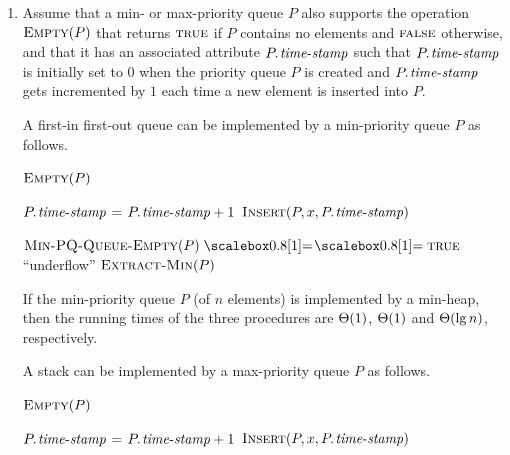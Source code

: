 \begin{enumerate}[\thesection-1]
\begin{codebox}
\li \While $i > 1$ and $\attrib{A[\proc{Parent}(i)]}{key} < \attrib{A[i]}{key}$
\li \Do
         $A[i] \gets A[\proc{Parent}(i)]$, updating the information that maps
\zi      priority queue objects to array indices
\li      $i \gets \proc{Parent}(i)$
    \End
\li $A[i] \gets x$
\end{codebox}
%
\item Assume that a min- or max-priority queue $P$ also supports the operation $\textnormal{\scshape Empty}(P)$ that returns $\textnormal{\scshape true}$ if $P$ contains no elements and $\textnormal{\scshape false}$ otherwise, and that it has an associated attribute $\attrib{P}{time-stamp}$ such that $\attrib{P}{time-stamp}$ is initially set to $0$ when the priority queue $P$ is created and $\attrib{P}{time-stamp}$ gets incremented by $1$ each time a new element is inserted into $P$.

A first-in first-out queue can be implemented by a min-priority queue $P$ as follows.
\begin{codebox}
\li \Return $\textnormal{\scshape Empty}(P)$
\end{codebox}

\begin{codebox}
\li $\attrib{P}{time-stamp} \gets \attrib{P}{time-stamp} + 1$
\li $\proc{Insert}(P, x, \attrib{P}{time-stamp})$
\end{codebox}

\begin{codebox}
\li \If $\proc{Min-PQ-Queue-Empty}(P) \isequal \const{true}$
\li \Then
          \Error ``underflow''
    \End
\li \Return $\textnormal{\scshape Extract-Min}(P)$
\end{codebox}
If the min-priority queue $P$ (of $n$ elements) is implemented by a min-heap, then the running times of the three procedures are $\Theta\!\left(1\right)$, $\Theta\!\left(1\right)$ and $\Theta\!\left(\lg n\right)$, respectively.

A stack can be implemented by a max-priority queue $P$ as follows.
\begin{codebox}
\li \Return $\textnormal{\scshape Empty}(P)$
\end{codebox}

\begin{codebox}
\li $\attrib{P}{time-stamp} \gets \attrib{P}{time-stamp} + 1$
\li $\proc{Insert}(P, x, \attrib{P}{time-stamp})$
\end{codebox}


\end{enumerate}
